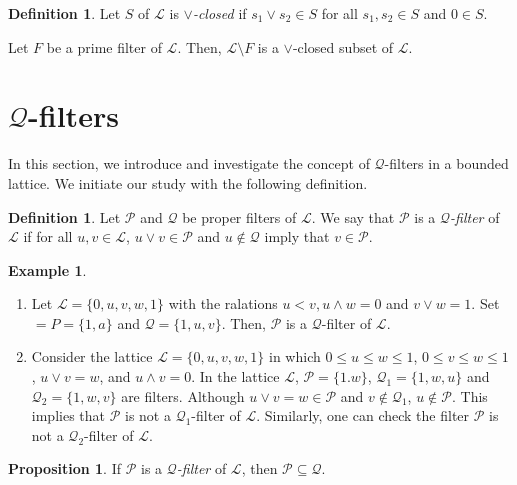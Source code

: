 \documentclass[preprint,review,10pt]{amsart}
\theoremstyle{definition}
\newtheorem{definition}[theorem]{Definition}
\newtheorem{example}[theorem]{Example}
\newtheorem{proposition}[theorem]{Proposition}
\theoremstyle{remark}
\numberwithin{equation}{section}
\begin{document}
\begin{definition}
\cite{Atani2} Let  $S$ of $\mathcal{L}$ is \textit{$\vee$-closed} if  $s_1 \vee s_2 \in S$ for all $s_1, s_2 \in S$ and $0 \in S$.
\end{definition}
Let $F$ be a prime filter of $\mathcal{L}$. Then, $\mathcal{L} \setminus F$ is a $\vee$-closed subset of $\mathcal{L}$. 
\section{$\mathcal{Q}$-filters}
In this section, we introduce and investigate the  concept of $\mathcal{Q}$-filters in a bounded lattice. We initiate our study with the following definition.
\begin{definition}
Let $\mathcal{P}$ and $ \mathcal{Q}$ be  proper filters of $\mathcal{L}$. We say that $\mathcal{P}$ is a {\it $\mathcal{Q}$-filter} of $\mathcal{L}$  if  for all $u,v \in \mathcal{L}$,   $u \vee v \in \mathcal{P}$ and $u \notin \mathcal{Q}$ imply that   $v \in \mathcal{P}$.
\end{definition}
\begin{example} \label{exa1}
\begin{enumerate}
\item Let $\mathcal{L}=\{0,u,v,w,1\}$ with the ralations $u < v, u \wedge w=0$ and $v \vee w=1$. Set $\mathcal={P}=\{1,a\}$ and $\mathcal{Q}=\{1,u,v\}$. Then, $\mathcal{P}$ is a $\mathcal{Q}$-filter of $\mathcal{L}$.
\item Consider the lattice $\mathcal{L} = \{0, u, v, w, 1\}$   in which  $0 \le u \le w \le 1$, $0 \le v \le w \le 1$, $u \vee v = w$, and $u \wedge v = 0$. In the lattice $\mathcal{L}$, $\mathcal{P}=\{1.w\}$, $\mathcal{Q}_1=\{1,w,u\}$ and $\mathcal{Q}_2=\{1,w,v\}$ are filters.   Although  $u \vee v =w\in \mathcal{P}$ and $v \notin \mathcal{Q}_1$, $u \notin  \mathcal{P}$. This implies that $\mathcal{P}$ is not a $\mathcal{Q}_1$-filter of $\mathcal{L}$. Similarly, one  can  check the filter $\mathcal{P}$  is  not a  $\mathcal{Q}_2$-filter  of $\mathcal{L}$.
 \end{enumerate}
\end{example}
\begin{proposition}
If $\mathcal{P}$ is a {\it $\mathcal{Q}$-filter} of $\mathcal{L}$, then $\mathcal{P} \subseteq  \mathcal{Q}$. 
\end{proposition}
\end{document}
